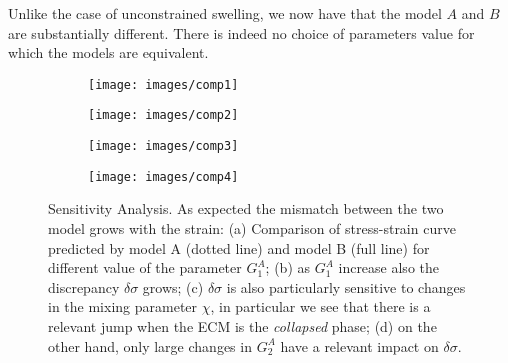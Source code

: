 Unlike the case of unconstrained swelling, we now have that the model $A$ and $B$ are substantially different. There is indeed no choice of parameters value for which the models are equivalent. 

\begin{figure}[h!]
	\begin{subfigure}{0.49\textwidth}
		\texttt{[image: images/comp1]}
		\caption{}
	\end{subfigure}
	\begin{subfigure}{0.49\textwidth}
		\texttt{[image: images/comp2]}
		\caption{}
	\end{subfigure}
	
	\begin{subfigure}{0.49\textwidth}
		\texttt{[image: images/comp3]}
		\caption{}
	\end{subfigure}
	\begin{subfigure}{0.49\textwidth}
		\texttt{[image: images/comp4]}
		\caption{}
	\end{subfigure}
	\caption{Sensitivity Analysis. As expected the mismatch between the two model grows with the strain: (a) Comparison of stress-strain curve predicted by model A (dotted line) and model B (full line) for different value of the parameter $G^A_1$; (b) as $G_1^A$ increase also the discrepancy $\delta\sigma$ grows; (c) $\delta\sigma$ is also particularly sensitive to changes in the mixing parameter $\chi$, in particular we see that there is a relevant jump when the ECM is the \textit{collapsed} phase; (d) on the other hand, only large changes in $G^A_2$ have a relevant impact on $\delta\sigma$.}
	\label{comp3}
\end{figure}

